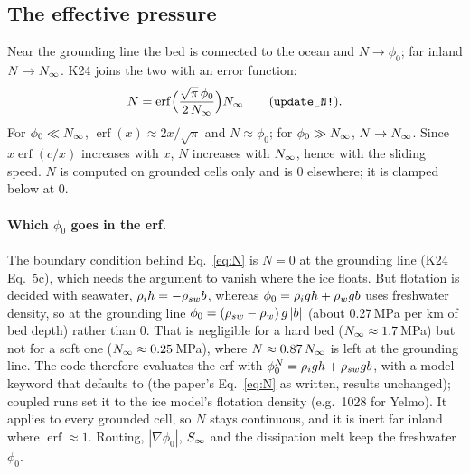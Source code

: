 \subsection{The effective pressure}
Near the grounding line the bed is connected to the ocean and $N\to\phi_0$; far inland $N\to{N_\infty}$. K24 joins the
two with an error function:
\begin{equation}\label{eq:N}
N = \operatorname{erf}\Bigl(\frac{\sqrt\pi\,\phi_0}{2\,{N_\infty}}\Bigr){N_\infty} \qquad(\texttt{update\_N!}).
\end{equation}
For $\phi_0\ll{N_\infty}$, $\operatorname{erf}(x)\approx 2x/\sqrt\pi$ and $N\approx\phi_0$; for $\phi_0\gg{N_\infty}$, $N\to{N_\infty}$.
Since $x\operatorname{erf}(c/x)$ increases with $x$, $N$ increases with ${N_\infty}$, hence with the sliding speed. $N$ is
computed on grounded cells only and is 0 elsewhere; it is clamped below at 0.

\paragraph{Which $\phi_0$ goes in the erf.} The boundary condition behind Eq.~\eqref{eq:N} is $N = 0$ at the grounding
line (K24 Eq.~5c), which needs the argument to vanish where the ice floats. But flotation is decided with seawater,
${\rho_i} h = -{\rho_{sw}} b$, whereas $\phi_0 = {\rho_i} g h + {\rho_w} g b$ uses freshwater density, so at the grounding line
$\phi_0 = ({\rho_{sw}}-{\rho_w})\,g\,|b|$ (about 0.27\,MPa per km of bed depth) rather than 0. That is negligible for a hard
bed (${N_\infty}\approx 1.7$\,MPa) but not for a soft one (${N_\infty}\approx 0.25$\,MPa), where $N\approx 0.87\,{N_\infty}$ is left at
the grounding line. The code therefore evaluates the erf with
$\phi_0^{N} = {\rho_i} g h + {\rho_{sw}} g b$, with  a model keyword that defaults to  (the paper's
Eq.~\eqref{eq:N} as written, results unchanged); coupled runs set it to the ice model's flotation density (e.g.\ 1028
for Yelmo). It applies to every grounded cell, so $N$ stays continuous, and it is inert far inland where
$\operatorname{erf}\approx1$. Routing, $|\nabla\phi_0|$, ${S_\infty}$ and the dissipation melt keep the freshwater $\phi_0$.

